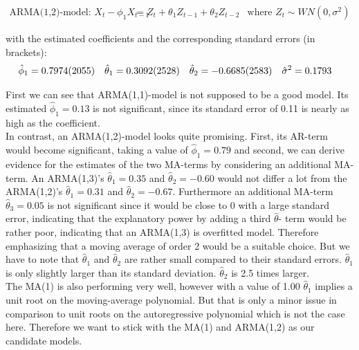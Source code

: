 \documentclass[11pt,a4paper]{article}
\begin{document}
\begin{align*}
    \text{ARMA(1,2)-model: }X_t - \phi_1 X_{t-1} &= Z_t + \theta_1 Z_{t-1} + \theta_2 Z_{t-2}
    & \text{where ${Z_t} \sim WN(0,\sigma^2)$}    
\end{align*}

with the estimated coefficients and the corresponding standard errors (in brackets):
%
%
\begin{align*}
    \hat{\phi}_1    &= \num{ 0.7974 \pm 0.2055}  &  \hat{\theta}_1  &= \num{ 0.3092 \pm 0.2528} &
    \hat{\theta}_2  &= \num{-0.6685 \pm 0.2583}  &  \hat{\sigma}^2  &= \num{ 0.1793 }  
\end{align*}


First we can see that ARMA(1,1)-model is not supposed to be a good model. Its estimated $\hat{\phi}_1=0.13$ is not significant, since its standard error of 0.11 is nearly as high as the coefficient.\\
In contrast, an ARMA(1,2)-model looks quite promising. First, its AR-term would become significant, taking a value of $\hat{\phi}_1=0.79$ and second, we can derive evidence for the estimates of the two MA-terms by considering an additional MA-term. An ARMA(1,3)'s $\hat{\theta}_1 = 0.35$ and $\hat{\theta}_2= -0.60$ would not differ a lot from the ARMA(1,2)'s $\hat{\theta}_1 = 0.31$ and $\hat{\theta}_2 = -0.67$. Furthermore an additional MA-term $\hat{\theta}_3 = 0.05$ is not significant since it would be close to 0 with a large standard error, indicating that the explanatory power by adding a third $\hat{\theta}$- term would be rather poor, indicating that an ARMA(1,3) is overfitted model. Therefore emphasizing that a moving average of order 2 would be a suitable choice.
But we have to note that $\hat{\theta}_1$ and $\hat{\theta}_2$ are rather small compared to their standard errors.
$\hat{\theta}_1$ is only slightly larger than its standard deviation.
$\hat{\theta}_2$ is 2.5 times larger.
\\
The MA(1) is also performing very well, however with a value of 1.00 $\hat{\theta}_1$ implies a unit root on the moving-average polynomial. But that is only a minor issue in comparison to unit roots on the autoregressive polynomial \cite[p.~42--83]{bd02} which is not the case here. Therefore we want to stick with the MA(1) and ARMA(1,2) as our candidate models.



\end{document}
